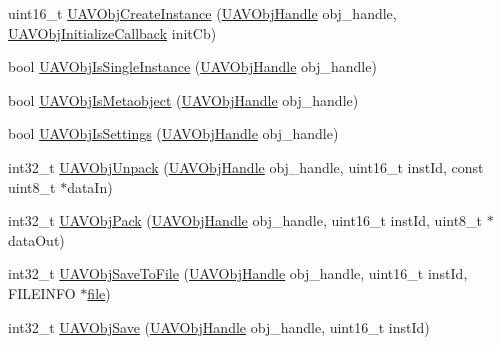 \begin{DoxyCompactItemize}
\item 
uint16\-\_\-t \hyperlink{group___u_a_v_object_handling_gac892e6dac1fb6de05ed730aa15b65a65}{\-U\-A\-V\-Obj\-Create\-Instance} (\hyperlink{targets_2_u_a_v_objects_2inc_2uavobjectmanager_8h_a279053e22be53ce9f895043aaeb91e3b}{\-U\-A\-V\-Obj\-Handle} obj\-\_\-handle, \hyperlink{targets_2_u_a_v_objects_2inc_2uavobjectmanager_8h_a16def10911b9b7e8626c2d1e3fec6e67}{\-U\-A\-V\-Obj\-Initialize\-Callback} init\-Cb)
\item 
bool \hyperlink{group___u_a_v_object_handling_gadd4119ec326e9718543908e796bf46b2}{\-U\-A\-V\-Obj\-Is\-Single\-Instance} (\hyperlink{targets_2_u_a_v_objects_2inc_2uavobjectmanager_8h_a279053e22be53ce9f895043aaeb91e3b}{\-U\-A\-V\-Obj\-Handle} obj\-\_\-handle)
\item 
bool \hyperlink{group___u_a_v_object_handling_ga52c0794e99c2ae401c5ed7f25a67e51a}{\-U\-A\-V\-Obj\-Is\-Metaobject} (\hyperlink{targets_2_u_a_v_objects_2inc_2uavobjectmanager_8h_a279053e22be53ce9f895043aaeb91e3b}{\-U\-A\-V\-Obj\-Handle} obj\-\_\-handle)
\item 
bool \hyperlink{group___u_a_v_object_handling_ga78e3c762f51cb6b295c7b8f787fa2ba1}{\-U\-A\-V\-Obj\-Is\-Settings} (\hyperlink{targets_2_u_a_v_objects_2inc_2uavobjectmanager_8h_a279053e22be53ce9f895043aaeb91e3b}{\-U\-A\-V\-Obj\-Handle} obj\-\_\-handle)
\item 
int32\-\_\-t \hyperlink{group___u_a_v_object_handling_gae54216880f0d6f603497b8fad60d0c95}{\-U\-A\-V\-Obj\-Unpack} (\hyperlink{targets_2_u_a_v_objects_2inc_2uavobjectmanager_8h_a279053e22be53ce9f895043aaeb91e3b}{\-U\-A\-V\-Obj\-Handle} obj\-\_\-handle, uint16\-\_\-t inst\-Id, const uint8\-\_\-t $\ast$data\-In)
\item 
int32\-\_\-t \hyperlink{group___u_a_v_object_handling_gaeced79a2ea987ec860ba7468df886ecd}{\-U\-A\-V\-Obj\-Pack} (\hyperlink{targets_2_u_a_v_objects_2inc_2uavobjectmanager_8h_a279053e22be53ce9f895043aaeb91e3b}{\-U\-A\-V\-Obj\-Handle} obj\-\_\-handle, uint16\-\_\-t inst\-Id, uint8\-\_\-t $\ast$data\-Out)
\item 
int32\-\_\-t \hyperlink{group___u_a_v_object_handling_ga417bd4dd0d0c7b33938e2351b0bba8b2}{\-U\-A\-V\-Obj\-Save\-To\-File} (\hyperlink{targets_2_u_a_v_objects_2inc_2uavobjectmanager_8h_a279053e22be53ce9f895043aaeb91e3b}{\-U\-A\-V\-Obj\-Handle} obj\-\_\-handle, uint16\-\_\-t inst\-Id, \-F\-I\-L\-E\-I\-N\-F\-O $\ast$\hyperlink{group___w_a_v_e_p_l_a_y_e_r___private___variables_ga48b699d30a027a1d6326588c99d716e1}{file})
\item 
int32\-\_\-t \hyperlink{group___u_a_v_object_handling_gab06b41f74db97895f2de3ec8772ddcd9}{\-U\-A\-V\-Obj\-Save} (\hyperlink{targets_2_u_a_v_objects_2inc_2uavobjectmanager_8h_a279053e22be53ce9f895043aaeb91e3b}{\-U\-A\-V\-Obj\-Handle} obj\-\_\-handle, uint16\-\_\-t inst\-Id)

\end{DoxyCompactItemize}

